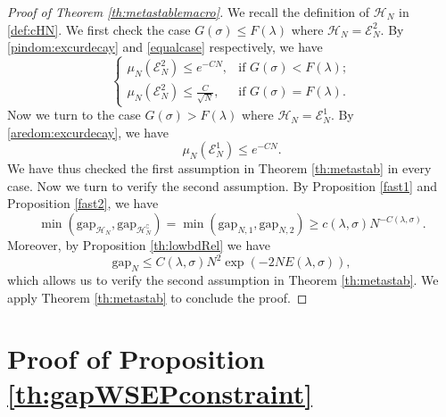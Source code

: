 \documentclass[reqno,11pt]{amsart}
\numberwithin{equation}{section}
\newcommand{\gl}{\lambda}
\newcommand{\gs}{\sigma}
\newcommand{\cE}{{\ensuremath{\mathcal E}} }
\newcommand{\cH}{{\ensuremath{\mathcal H}} }
\newcommand{\red}{\color{darkred}}
\newcommand{\Gap}{\mathrm{gap}}
\begin{document}
\begin{proof}[Proof of Theorem \ref{th:metastablemacro}] We recall the definition of $\cH_N$ in \eqref{def:cHN}. 
We first check the case $G(\gs) \le F(\gl)$ where $\cH_N= \cE_N^2$. By  \eqref{pindom:excurdecay} and \eqref{equalcase} respectively, we have
\begin{equation}
\begin{cases}
\mu_N(\cE_N^2) \le e^{-C N}, & \mbox{if }  G(\gs) < F(\gl);\\
\mu_N(\cE_N^2) \le  \frac{C}{\sqrt{N}}, & \mbox{if } G(\gs) = F(\gl).
\end{cases}
\end{equation}
Now we turn to the case $G(\gs)>F(\gl)$ where $\cH_N= \cE_N^1$. By \eqref{aredom:excurdecay}, we have
\begin{equation}
\mu_N(\cE_N^1) \le e^{-CN}.
\end{equation} 
We have thus checked the first assumption in Theorem \ref{th:metastab} in every case.
Now we turn to verify the second assumption. By Proposition \ref{fast1} and Proposition \ref{fast2}, we have
$$ \min \left ( \Gap_{\cH_N},  \Gap_{\cH_N^{\complement}} \right)= \min \left( \Gap_{N,1},  \Gap_{N,2} \right)\ge   c(\gl,\sigma) N^{-C(\gl, \gs)}.$$
Moreover, by Proposition \ref{th:lowbdRel} we have
\begin{equation}
\Gap_N \le  C(\gl, \gs) N^2 \exp \left(-2N E(\gl,\gs)\right),
\end{equation}
 which allows us to verify the second assumption in Theorem \ref{th:metastab}. We apply Theorem \ref{th:metastab} to conclude the proof.
\end{proof}

\appendix



\section{Proof of Proposition \ref{th:gapWSEPconstraint}}\label{appdix:WSEP}
\end{document}
